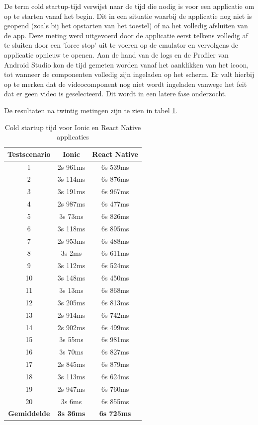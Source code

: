De term cold startup-tijd verwijst naar de tijd die nodig is voor een applicatie om op te starten vanaf het begin. Dit in een situatie waarbij de applicatie nog niet is geopend (zoals bij het opstarten van het toestel) of na het volledig afsluiten van de app. Deze meting werd uitgevoerd door de applicatie eerst telkens volledig af te sluiten door een 'force stop' uit te voeren op de emulator en vervolgens de applicatie opnieuw te openen. Aan de hand van de logs en de Profiler van Android Studio kon de tijd gemeten worden vanaf het aanklikken van het icoon, tot wanneer de componenten volledig zijn ingeladen op het scherm. Er valt hierbij op te merken dat de videocomponent nog niet wordt ingeladen vanwege het feit dat er geen video is geselecteerd. Dit wordt in een latere fase onderzocht.

De resultaten na twintig metingen zijn te zien in tabel \ref{tab:cold_startup}.

\begin{table}[htbp]
  \centering
  \begin{tabular}{|c|c|c|}
    \hline
    \textbf{Testscenario} & \textbf{Ionic} & \textbf{React Native} \\
    \hline
    1 & 2s 961ms & 6s 539ms \\
    \hline
    2 & 3s 114ms & 6s 876ms \\
    \hline
    3 & 3s 191ms & 6s 967ms \\
    \hline
    4 & 2s 987ms & 6s 477ms \\
    \hline
    5 & 3s 73ms & 6s 826ms \\
    \hline
    6 & 3s 118ms & 6s 895ms \\
    \hline
    7 & 2s 953ms & 6s 488ms \\
    \hline
    8 & 3s 2ms & 6s 611ms \\
    \hline
    9 & 3s 112ms & 6s 524ms \\
    \hline
    10 & 3s 148ms & 6s 450ms \\
    \hline
    11 & 3s 13ms & 6s 868ms \\
    \hline
    12 & 3s 205ms & 6s 813ms \\
    \hline
    13 & 2s 914ms & 6s 742ms \\
    \hline
    14 & 2s 902ms & 6s 499ms \\
    \hline
    15 & 3s 55ms & 6s 981ms \\
    \hline
    16 & 3s 70ms & 6s 827ms \\
    \hline
    17 & 2s 845ms & 6s 879ms \\
    \hline
    18 & 3s 113ms & 6s 624ms \\
    \hline
    19 & 2s 947ms & 6s 760ms \\
    \hline
    20 & 3s 6ms & 6s 855ms \\
    \hline
    \textbf{Gemiddelde} & \textbf{3s 36ms} & \textbf{6s 725ms} \\
    \hline
  \end{tabular}
  \caption{Cold startup tijd voor Ionic en React Native applicaties}
  \label{tab:cold_startup}
\end{table}

